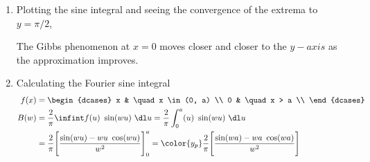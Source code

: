 \begin{enumerate}
    \item Plotting the sine integral and seeing the convergence of the extrema to
          $ y = \pi/2 $,
          \begin{figure}[H]
              \centering
              \anitablethree
          \end{figure}
          The Gibbs phenomenon at $ x = 0 $ moves closer and closer to the $ y-axis $
          as the approximation improves.

    \item Calculating the Fourier sine integral
          \begin{align}
              f(x) & = \begin{dcases}
                           x & \quad x \in (0, a) \\
                           0 & \quad x > a        \\
                       \end{dcases}                                   \\
              B(w) & = \frac{2}{\pi} \infint f(u)\ \sin(wu)\ \dl u
              = \frac{2}{\pi} \int_{0}^{a} (u)\ \sin(wu)\ \dl u                 \\
                   & = \frac{2}{\pi} \Bigg[ \frac{\sin(wu) - wu\ \cos(wu)}{w^2}
                  \Bigg]_0^a
              = \color{y_p} \frac{2}{\pi}\Bigg[ \frac{\sin(wa) -
                      wa\ \cos(wa)}{w^2} \Bigg]
          \end{align}


\end{enumerate}
